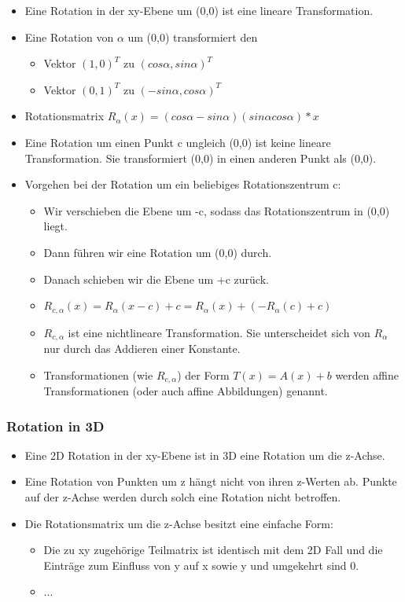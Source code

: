 \documentclass[paper=a4, fontsize=11pt]{scrartcl} %
\numberwithin{equation}{section} %
\numberwithin{figure}{section} %
\numberwithin{table}{section} %
\begin{document}
\begin{itemize}
\item Eine Rotation in der xy-Ebene um (0,0) ist eine lineare Transformation.
\item Eine Rotation von $\alpha$  um (0,0) transformiert den
\begin{itemize}
\item Vektor $(1,0)^T$ zu $(cos \alpha, sin \alpha)^T$
\item Vektor $(0,1)^T$ zu $(-sin \alpha, cos \alpha)^T$
\end{itemize}
\item Rotationsmatrix $R_\alpha(x) = (cos \alpha -sin \alpha) (sin \alpha cos \alpha) * x$
\item Eine Rotation um einen Punkt c ungleich (0,0) ist keine lineare Transformation. Sie transformiert (0,0) in einen anderen Punkt als (0,0).
\item Vorgehen bei der Rotation um ein beliebiges Rotationszentrum c:
\begin{itemize}
\item Wir verschieben die Ebene um -c, sodass das Rotationszentrum in (0,0) liegt.
\item Dann führen wir eine Rotation um (0,0) durch.
\item Danach schieben wir die Ebene um +c zurück.
\item $R_{c,\alpha}(x) = R_\alpha(x-c) + c = R_\alpha(x) + (-R_\alpha(c)+c)$
\item $R_{c,\alpha}$ ist eine nichtlineare Transformation. Sie unterscheidet sich von $R_\alpha$ nur durch das Addieren einer Konstante.
\item Transformationen (wie $R_{c,\alpha}$) der Form $T(x) = A(x) + b$ werden affine Transformationen (oder auch affine Abbildungen) genannt.
\end{itemize}
\end{itemize}

\subsubsection{Rotation in 3D}

\begin{itemize}
\item Eine 2D Rotation in der xy-Ebene ist in 3D eine Rotation um die z-Achse.
\item Eine Rotation von Punkten um z hängt nicht von ihren z-Werten ab. Punkte auf der z-Achse werden durch solch eine Rotation nicht betroffen.
\item Die Rotationsmatrix um die z-Achse besitzt eine einfache Form:
\begin{itemize}
\item Die zu xy zugehörige Teilmatrix ist identisch mit dem 2D Fall und die Einträge zum Einfluss von y auf x sowie y und umgekehrt sind 0.
\item ...
\end{itemize}
\end{itemize}
\end{document}
